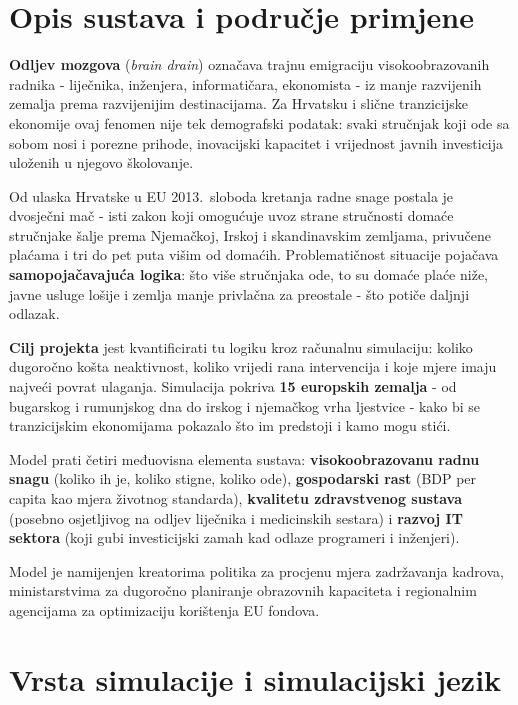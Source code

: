 \documentclass[11pt,a4paper]{article}
\begin{document}
\section{Opis sustava i područje primjene}

\textbf{Odljev mozgova} (\textit{brain drain}) označava trajnu emigraciju visokoobrazovanih radnika  - liječnika, inženjera, informatičara, ekonomista  - iz manje razvijenih zemalja prema razvijenijim destinacijama. Za Hrvatsku i slične tranzicijske ekonomije ovaj fenomen nije tek demografski podatak: svaki stručnjak koji ode sa sobom nosi i porezne prihode, inovacijski kapacitet i vrijednost javnih investicija uloženih u njegovo školovanje.

Od ulaska Hrvatske u EU 2013.\ sloboda kretanja radne snage postala je dvosječni mač  - isti zakon koji omogućuje uvoz strane stručnosti domaće stručnjake šalje prema Njemačkoj, Irskoj i skandinavskim zemljama, privučene plaćama i tri do pet puta višim od domaćih. Problematičnost situacije pojačava \textbf{samopojačavajuća logika}: što više stručnjaka ode, to su domaće plaće niže, javne usluge lošije i zemlja manje privlačna za preostale  - što potiče daljnji odlazak.

\textbf{Cilj projekta} jest kvantificirati tu logiku kroz računalnu simulaciju: koliko dugoročno košta neaktivnost, koliko vrijedi rana intervencija i koje mjere imaju najveći povrat ulaganja. Simulacija pokriva \textbf{15 europskih zemalja}  - od bugarskog i rumunjskog dna do irskog i njemačkog vrha ljestvice  - kako bi se tranzicijskim ekonomijama pokazalo što im predstoji i kamo mogu stići.

Model prati četiri međuovisna elementa sustava: \textbf{visokoobrazovanu radnu snagu} (koliko ih je, koliko stigne, koliko ode), \textbf{gospodarski rast} (BDP per capita kao mjera životnog standarda), \textbf{kvalitetu zdravstvenog sustava} (posebno osjetljivog na odljev liječnika i medicinskih sestara) i \textbf{razvoj IT sektora} (koji gubi investicijski zamah kad odlaze programeri i inženjeri).

Model je namijenjen kreatorima politika za procjenu mjera zadržavanja kadrova, ministarstvima za dugoročno planiranje obrazovnih kapaciteta i regionalnim agencijama za optimizaciju korištenja EU fondova.

\section{Vrsta simulacije i simulacijski jezik}
\end{document}

